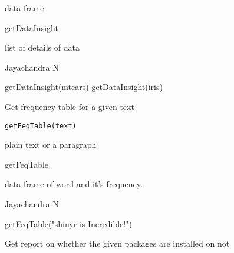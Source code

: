 \documentclass[a4paper]{book}
\begin{document}
%
\begin{Arguments}
\begin{ldescription}
\item[\code{temp}] data frame
\end{ldescription}
\end{Arguments}
%
\begin{Details}\relax
getDataInsight
\end{Details}
%
\begin{Value}
list of details of data
\end{Value}
%
\begin{Author}\relax
Jayachandra N
\end{Author}
%
\begin{Examples}
\begin{ExampleCode}
getDataInsight(mtcars)
getDataInsight(iris)
\end{ExampleCode}
\end{Examples}
%
\begin{Description}\relax
Get frequency table for a given text
\end{Description}
%
\begin{Usage}
\begin{verbatim}
getFeqTable(text)
\end{verbatim}
\end{Usage}
%
\begin{Arguments}
\begin{ldescription}
\item[\code{text}] plain text or a paragraph
\end{ldescription}
\end{Arguments}
%
\begin{Details}\relax
getFeqTable
\end{Details}
%
\begin{Value}
data frame of word and it's frequency.
\end{Value}
%
\begin{Author}\relax
Jayachandra N
\end{Author}
%
\begin{Examples}
\begin{ExampleCode}
getFeqTable("shinyr is Incredible!")
\end{ExampleCode}
\end{Examples}
%
\begin{Description}\relax
Get report on whether the given packages are installed on not
\end{Description}
\end{document}
